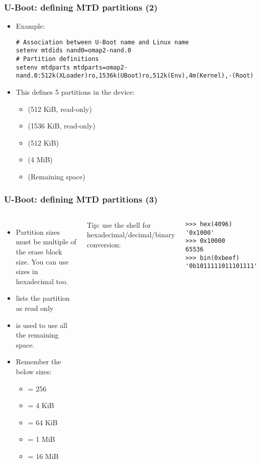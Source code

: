 \begin{frame}[fragile]
  \frametitle{U-Boot: defining MTD partitions (2)}
  \begin{itemize}
  \item Example:
  {\scriptsize
  \begin{verbatim}
# Association between U-Boot name and Linux name
setenv mtdids nand0=omap2-nand.0
# Partition definitions
setenv mtdparts mtdparts=omap2-nand.0:512k(XLoader)ro,1536k(UBoot)ro,512k(Env),4m(Kernel),-(Root)
  \end{verbatim}
  }
  \item This defines 5 partitions in the  device:
    \begin{itemize}
    \item {} (512 KiB, read-only)
    \item {} (1536 KiB, read-only)
    \item {} (512 KiB)
    \item {} (4 MiB)
    \item {} (Remaining space)
    \end{itemize}
  \end{itemize}
\end{frame}

\begin{frame}[fragile]
  \frametitle{U-Boot: defining MTD partitions (3)}
  \begin{columns}
    \begin{itemize}
    \item Partition sizes must be multiple of the erase block size.
      You can use sizes in hexadecimal too.
    \item {} lists the partition as read only
    \item \code{-} is used to use all the remaining space.
    \item Remember the below sizes:
    \begin{itemize}
      \item {} = 256
      \item {} = 4 KiB
      \item {} = 64 KiB
      \item {} = 1 MiB
      \item {} = 16 MiB
    \end{itemize}
    \end{itemize}
    Tip: use the  shell for hexadecimal/decimal/binary conversion:
    \begin{block}{}
    \begin{verbatim}
>>> hex(4096)
'0x1000'
>>> 0x10000
65536
>>> bin(0xbeef)
'0b1011111011101111'
    \end{verbatim}
    \end{block}
  \end{columns}
\end{frame}



